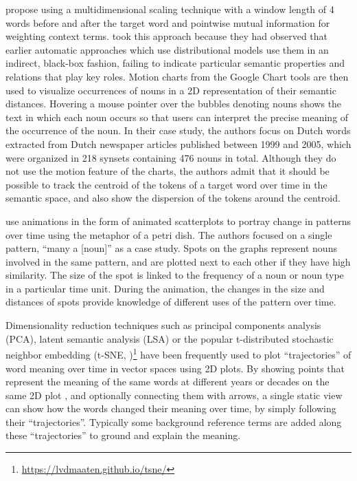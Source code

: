 \documentclass[output=paper%
]{langsci/langscibook}
\begin{document}
\citet{heylen2012looking} propose using a multidimensional scaling \citep{cox2008multidimensional} technique with a window length of 4 words before and after the target word and pointwise mutual information for weighting context terms. 
\citet{heylen2012looking} took this approach because they had observed that earlier automatic approaches which use distributional models use them in an indirect, black-box fashion, failing to indicate particular semantic properties and relations that play key roles. Motion charts from the Google Chart tools are then used to visualize occurrences of nouns in a 2D representation of their semantic distances. Hovering a mouse pointer over the bubbles denoting nouns shows the text in which each noun occurs so that users can interpret the precise meaning of the occurrence of the noun. In their case study, the authors focus on Dutch words extracted from Dutch newspaper articles published between 1999 and 2005, which were organized in 218 synsets containing 476 nouns in total. Although they do not use the motion feature of the charts, the authors admit that it should be possible to track the centroid of the tokens of a target word over time in the semantic space, and also show the dispersion of the tokens around the centroid.

\citet{hilpert2015meaning} use animations in the form of animated scatterplots to portray change in patterns over time using the metaphor of a petri dish. The authors focused on a single pattern, ``many a [noun]'' as a case study. Spots on the graphs represent nouns involved in the same pattern, and are plotted next to each other if they have high similarity. The size of the spot is linked to the frequency of a noun or noun type in a particular time unit. During the animation, the changes in the size and distances of spots provide knowledge of different uses of the pattern over time.

\begin{sloppypar}
Dimensionality reduction techniques such as principal components analysis (PCA), latent semantic analysis (LSA) or the popular t-distributed stochastic neighbor embedding (t-SNE, \citealt{maaten2008visualizing})\footnote{\url{https://lvdmaaten.github.io/tsne/}} have been frequently used to plot ``trajectories'' of word meaning over time in vector spaces using 2D plots. By showing points that represent the meaning of the same words at different years or decades on the same 2D plot \citep[see, e.g.,][]{hamilton-etal-2016-cultural,kulkarni2015statistically}, and optionally connecting them with arrows, a single static view can show how the words changed their meaning over time, by simply following their ``trajectories''. Typically some background reference terms are added along these ``trajectories'' to ground and explain the meaning.
\end{sloppypar}
\end{document}
